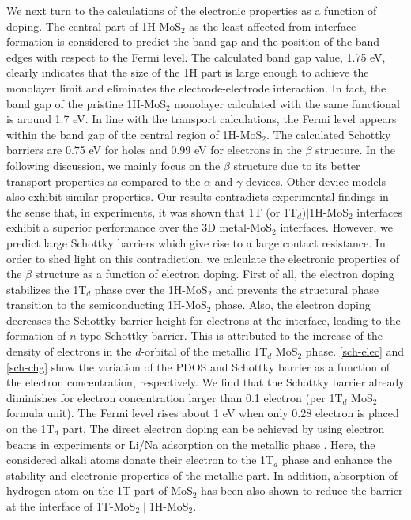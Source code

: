 We next turn to the calculations of the electronic properties as a function of doping.
The central part of 1H-MoS$_2$ as the least affected from interface formation is considered to predict the band gap and the position of the band edges with respect to the Fermi level. The calculated band gap value, 1.75 eV,  clearly indicates that the size of the 1H part is large enough to achieve the monolayer limit and eliminates the electrode-electrode interaction. 
In fact, the band gap of the pristine 1H-MoS$_2$ monolayer calculated with the same functional is around 1.7 eV. 
In line with the transport calculations, the Fermi level appears within the band gap of the central region of 1H-MoS$_2$. The calculated Schottky barriers are 0.75 eV for holes and 0.99 eV for electrons in the $\beta$ structure. In the following discussion, we mainly focus on the $\beta$ structure due to its better transport properties as compared to the  $\alpha$ and  $\gamma$ devices. Other device models also exhibit similar properties. Our results contradicts experimental findings in the sense that, in experiments, it was shown that 1T (or 1T$_d$)$\mid$1H-MoS$_2$ interfaces exhibit a superior performance over the 3D metal-MoS$_2$ interfaces. However, we predict large Schottky barriers which give rise to a large contact resistance. In order to shed light on this contradiction, we calculate the electronic properties of the $\beta$ structure as a function of electron doping.   First of all, the electron doping stabilizes the 1T$_d$ phase over the 1H-MoS$_2$ and prevents the structural phase transition to the semiconducting 1H-MoS$_2$ phase\cite{doi:10.1021/jp4076355}. Also, the electron doping decreases the Schottky barrier height for electrons at the interface, leading to the formation of $n$-type Schottky barrier. This is attributed to the increase of the density of electrons in the $d$-orbital of the metallic 1T$_d$ MoS$_2$ phase. \autoref{sch-elec} and \autoref{sch-chg} show the variation of the PDOS and Schottky barrier as a function of the electron concentration, respectively. We find that the Schottky barrier already diminishes for electron concentration larger than 0.1 electron (per 1T$_d$ MoS$_2$ formula unit). The Fermi level rises about 1 eV when only 0.28 electron is placed on the 1T$_d$ part. The direct electron doping can be achieved by using electron beams in experiments or Li/Na adsorption on the metallic phase\cite{doi:10.1021/acs.nanolett.6b01186,doi:10.1021/jp4076355} . Here, the considered alkali atoms donate their electron to the 1T$_d$ phase and enhance the stability and electronic properties of the metallic part\cite{doi:10.1021/jp4076355}. In addition, absorption of hydrogen atom on the 1T part of MoS$_2$ has been also shown to reduce the barrier at the interface of 1T-MoS$_2\mid$1H-MoS$_2$\cite{doi:10.1021/acs.nanolett.6b03999,doi:10.1021/acs.chemmater.5b00986}. 

